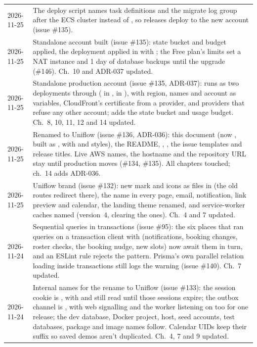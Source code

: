 \begin{xltabular}{\linewidth}{@{}l L@{}}
  2026-11-25 & The deploy script names task definitions and the migrate log group after the ECS cluster instead of , so releases deploy to the new account (issue \#135).\\
  2026-11-25 & Standalone account built (issue \#135): state bucket and budget applied, the  deployment applied in  with ; the Free plan's limits set a  NAT instance and 1 day of database backups until the upgrade (\#146). Ch.~10 and ADR-037 updated.\\
  2026-11-25 & Standalone production account (issue \#135, ADR-037):  runs as two deployments through  ( in ,  in ), with region, names and account as variables, CloudFront's certificate from a  provider, and providers that refuse any other account;  adds the state bucket and usage budget. Ch.~8, 10, 11, 12 and 14 updated.\\
  2026-11-25 & Renamed to Uniflow (issue \#136, ADR-036): this document (now , built as , with  and  styles), the README, , , the issue templates and release titles. Live AWS names, the hostname and the repository URL stay until production moves (\#134, \#135). All chapters touched; ch.~14 adds ADR-036.\\
  2026-11-25 & Uniflow brand (issue \#132): new mark and icons as files in  (the old  routes redirect there), the name in every page, email, notification, link preview and calendar, the landing theme renamed, and service-worker caches named  (version~4, clearing the  ones). Ch.~4 and 7 updated.\\
  2026-11-24 & Sequential queries in transactions (issue \#95): the six places that ran queries on a transaction client with  (notifications, booking changes, roster checks, the booking nudge, new slots) now await them in turn, and an ESLint rule rejects the pattern. Prisma's own parallel relation loading inside transactions still logs the warning (issue \#140). Ch.~7 updated.\\
  2026-11-24 & Internal names for the rename to Uniflow (issue \#133): the session cookie is , with  and  still read until those sessions expire; the outbox channel is , with web signalling and the worker listening on  too for one release; the dev database, Docker project,  host, seed accounts, test databases, package and image names follow. Calendar UIDs keep their suffix so saved demos aren't duplicated. Ch.~4, 7 and 9 updated.\\

\end{xltabular}
